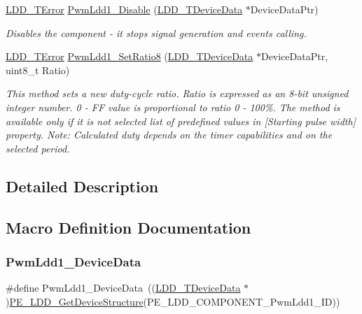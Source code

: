 \begin{DoxyCompactItemize}
\hyperlink{group___p_e___types__module_ga24c2b045fd04e79e85f261ce4df35588}{L\+D\+D\+\_\+\+T\+Error} \hyperlink{group___pwm_ldd1__module_gadaeb47f81e90a1e38e65d1bc79fbe794}{Pwm\+Ldd1\+\_\+\+Disable} (\hyperlink{group___p_e___types__module_gac5cf1362f1f0e3a2ce71b1bf2276d091}{L\+D\+D\+\_\+\+T\+Device\+Data} $\ast$Device\+Data\+Ptr)
\begin{DoxyCompactList}\small\item\em Disables the component -\/ it stops signal generation and events calling. \end{DoxyCompactList}\item 
\hyperlink{group___p_e___types__module_ga24c2b045fd04e79e85f261ce4df35588}{L\+D\+D\+\_\+\+T\+Error} \hyperlink{group___pwm_ldd1__module_gacc3364eaed4b107d6f9c1e5b0c4325ef}{Pwm\+Ldd1\+\_\+\+Set\+Ratio8} (\hyperlink{group___p_e___types__module_gac5cf1362f1f0e3a2ce71b1bf2276d091}{L\+D\+D\+\_\+\+T\+Device\+Data} $\ast$Device\+Data\+Ptr, uint8\+\_\+t Ratio)
\begin{DoxyCompactList}\small\item\em This method sets a new duty-\/cycle ratio. Ratio is expressed as an 8-\/bit unsigned integer number. 0 -\/ FF value is proportional to ratio 0 -\/ 100\%. The method is available only if it is not selected list of predefined values in \mbox{[}Starting pulse width\mbox{]} property. Note\+: Calculated duty depends on the timer capabilities and on the selected period. \end{DoxyCompactList}\end{DoxyCompactItemize}


\subsection{Detailed Description}


\subsection{Macro Definition Documentation}
\mbox{\label{group___pwm_ldd1__module_ga1b3859d3bd55122c9154a66be455b8d9}} 
\subsubsection{\texorpdfstring{Pwm\+Ldd1\+\_\+\+Device\+Data}{PwmLdd1\_DeviceData}}
{\footnotesize\ttfamily \#define Pwm\+Ldd1\+\_\+\+Device\+Data~((\hyperlink{group___p_e___types__module_gac5cf1362f1f0e3a2ce71b1bf2276d091}{L\+D\+D\+\_\+\+T\+Device\+Data} $\ast$)\hyperlink{group___p_e___types__module_gaa1c23d559daef5bcd3327ca83fb56f5a}{P\+E\+\_\+\+L\+D\+D\+\_\+\+Get\+Device\+Structure}(P\+E\+\_\+\+L\+D\+D\+\_\+\+C\+O\+M\+P\+O\+N\+E\+N\+T\+\_\+\+Pwm\+Ldd1\+\_\+\+ID))}

